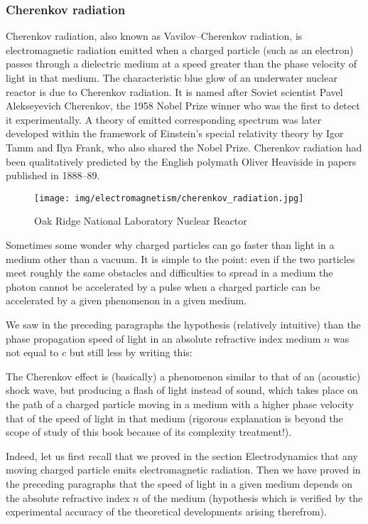 	\pagebreak
	\subsubsection{Cherenkov radiation}
	Cherenkov radiation, also known as Vavilov–Cherenkov radiation, is electromagnetic radiation emitted when a charged particle (such as an electron) passes through a dielectric medium at a speed greater than the phase velocity of light in that medium. The characteristic blue glow of an underwater nuclear reactor is due to Cherenkov radiation. It is named after Soviet scientist Pavel Alekseyevich Cherenkov, the 1958 Nobel Prize winner who was the first to detect it experimentally. A theory of emitted corresponding spectrum was later developed within the framework of Einstein's special relativity theory by Igor Tamm and Ilya Frank, who also shared the Nobel Prize. Cherenkov radiation had been qualitatively predicted by the English polymath Oliver Heaviside in papers published in 1888–89.
	
	\begin{figure}[H]
		\centering
		\texttt{[image: img/electromagnetism/cherenkov\_radiation.jpg]}
		\caption{Oak Ridge National Laboratory Nuclear Reactor}
	\end{figure}
	\begin{tcolorbox}[title=Remark,colframe=black,arc=10pt]
	Sometimes some wonder why charged particles can go faster than light in a medium other than a vacuum. It is simple to the point: even if the two particles meet roughly the same obstacles and difficulties to spread in a medium the photon cannot be accelerated by a pulse when a charged particle can be accelerated by a given phenomenon in a given medium.
	\end{tcolorbox}
	We saw in the preceding paragraphs the hypothesis (relatively intuitive) than the phase propagation speed of light in an absolute refractive index medium $n$ was not equal to $c$ but still less by writing this:
	
	The Cherenkov effect is (basically) a phenomenon similar to that of an (acoustic) shock wave, but producing a flash of light instead of sound, which takes place on the path of a charged particle moving in a medium with a higher phase velocity that of the speed of light in that medium (rigorous explanation is beyond the scope of study of this book because of its complexity treatment!).

	Indeed, let us first recall that we proved in the section Electrodynamics that any moving charged particle emits electromagnetic radiation. Then we have proved in the preceding paragraphs that the speed of light in a given medium depends on the absolute refractive index $n$ of the medium (hypothesis which is verified by the experimental accuracy of the theoretical developments arising therefrom).
	
